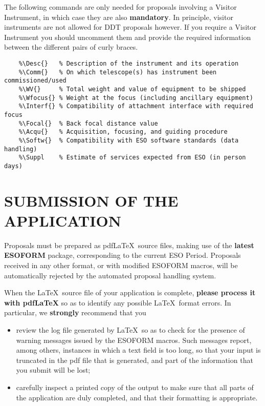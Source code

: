 \documentclass{article}
\begin{document}
The following commands are only needed for proposals involving a Visitor
Instrument, in which case they are also {\bf mandatory}. In principle,
visitor instruments are not allowed for DDT proposals however.
If you require a Visitor Instrument you should
uncomment them and provide the required information between the
different pairs of curly braces.

\begin{verbatim}
    %\Desc{}   % Description of the instrument and its operation
    %\Comm{}   % On which telescope(s) has instrument been commissioned/used
    %\WV{}     % Total weight and value of equipment to be shipped
    %\Wfocus{} % Weight at the focus (including ancillary equipment)
    %\Interf{} % Compatibility of attachment interface with required focus
    %\Focal{}  % Back focal distance value
    %\Acqu{}   % Acquisition, focusing, and guiding procedure
    %\Softw{}  % Compatibility with ESO software standards (data handling)
    %\Suppl    % Estimate of services expected from ESO (in person days)
\end{verbatim}


\section{SUBMISSION OF THE APPLICATION}
\label{sec:submission}

Proposals must be prepared as pdf\LaTeX\ source files, making use of
the {\bf latest ESOFORM} package, corresponding to the current ESO 
Period.  Proposals received in
any other format, or with modified ESOFORM macros, will be
automatically rejected by the automated proposal handling system.

When the \LaTeX\ source file of your application is complete, {\bf
  please process it with pdf\LaTeX} so as to identify any
possible \LaTeX\ format errors. In particular, we {\bf strongly}
recommend that you
\begin{itemize} 
\item review the log file generated by \LaTeX\ so as to
  check for the presence of warning messages issued by the ESOFORM
  macros. Such messages report, among others, instances in which a text
  field is too long, so that your input is truncated in the pdf file
  that is generated, and part of the information that you
  submit will be lost;
\item carefully inspect a printed copy of the output to make sure that
  all parts of the application are duly completed, and that their
  formatting is appropriate.
\end{itemize} 
\end{document}
